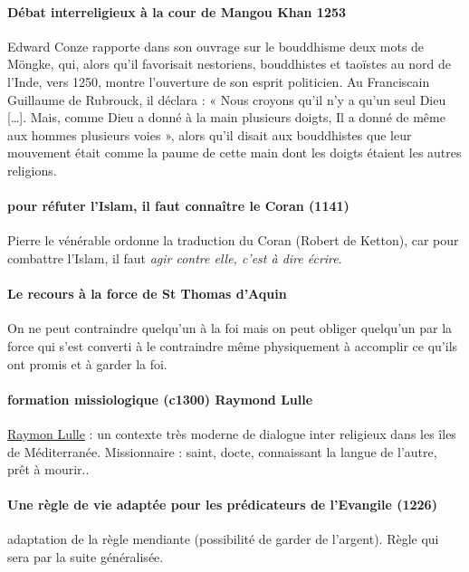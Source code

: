 \paragraph{Débat interreligieux à la cour de Mangou Khan 1253}  Edward Conze rapporte dans son ouvrage sur le bouddhisme deux mots de Möngke, qui, alors qu'il favorisait nestoriens, bouddhistes et taoïstes au nord de l'Inde, vers 1250, montre l'ouverture de son esprit politicien. Au Franciscain Guillaume de Rubrouck, il déclara : « Nous croyons qu'il n'y a qu'un seul Dieu […]. Mais, comme Dieu a donné à la main plusieurs doigts, Il a donné de même aux hommes plusieurs voies », alors qu'il disait aux bouddhistes que leur mouvement était comme la paume de cette main dont les doigts étaient les autres religions.

\paragraph{pour réfuter l'Islam, il faut connaître le Coran (1141)} Pierre le vénérable ordonne la traduction du Coran (Robert de Ketton), car pour combattre l'Islam, il faut \textit{agir contre elle, c'est à dire écrire}. 


\paragraph{Le recours à la force de St Thomas d'Aquin} On ne peut contraindre quelqu'un à la foi mais on peut obliger quelqu'un par la force qui s'est converti à le contraindre même physiquement à accomplir ce qu'ils ont promis et à garder la foi. 


\paragraph{formation missiologique (c1300) Raymond Lulle} \href{https://fr.wikipedia.org/wiki/Raymond_Lulle}{Raymon Lulle} : un contexte très moderne de dialogue inter religieux dans les îles de Méditerranée.  Missionnaire : saint, docte, connaissant la langue de l'autre, prêt à mourir.. 

\paragraph{Une règle de vie adaptée pour les prédicateurs de l'Evangile (1226)} adaptation de la règle mendiante (possibilité de garder de l'argent). Règle qui sera par la suite généralisée.


